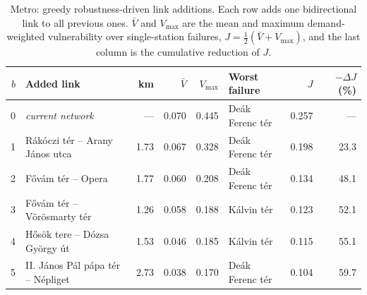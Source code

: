 \begin{table}[htbp]
\centering
\footnotesize
\begin{tabular}{r>{\raggedright\arraybackslash}p{5.0cm}rrr>{\raggedright\arraybackslash}p{3.0cm}rr}
\toprule
$b$ & Added link & km & $\bar V$ & $V_{\max}$ & Worst failure & $J$ & $-\Delta J$ (\%) \\
\midrule
0 & \emph{current network} & --- & 0.070 & 0.445 & De\'ak Ferenc t\'er & 0.257 & --- \\
1 & R\'ak\'oczi t\'er -- Arany J\'anos utca & 1.73 & 0.067 & 0.328 & De\'ak Ferenc t\'er & 0.198 & 23.3 \\
2 & F\H{o}v\'am t\'er -- Opera & 1.77 & 0.060 & 0.208 & De\'ak Ferenc t\'er & 0.134 & 48.1 \\
3 & F\H{o}v\'am t\'er -- V\"or\"osmarty t\'er & 1.26 & 0.058 & 0.188 & K\'alvin t\'er & 0.123 & 52.1 \\
4 & H\H{o}s\"ok tere -- D\'ozsa Gy\"orgy \'ut & 1.53 & 0.046 & 0.185 & K\'alvin t\'er & 0.115 & 55.1 \\
5 & II. J\'anos P\'al p\'apa t\'er -- N\'epliget & 2.73 & 0.038 & 0.170 & De\'ak Ferenc t\'er & 0.104 & 59.7 \\
\bottomrule
\end{tabular}
\caption{Metro: greedy robustness-driven link additions. Each row adds one bidirectional link to all previous ones. $\bar V$ and $V_{\max}$ are the mean and maximum demand-weighted vulnerability over single-station failures, $J=\tfrac12(\bar V+V_{\max})$, and the last column is the cumulative reduction of $J$.}
\label{tab:aug-metro}
\end{table}
